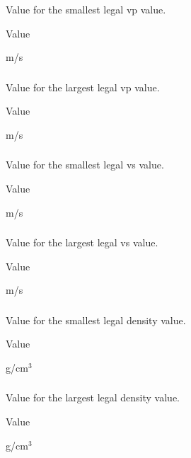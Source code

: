 \subsubsection{}
 \slist
   \item \Description Value for the smallest legal vp value.
   \item \Argument Value
   \item {} m/s
 \elist

\subsubsection{}
 \slist
   \item \Description Value for the largest legal vp value.
   \item \Argument Value
   \item {} m/s
 \elist

\subsubsection{}
 \slist
   \item \Description Value for the smallest legal vs value.
   \item \Argument Value
   \item {} m/s
 \elist

\subsubsection{}
 \slist
   \item \Description Value for the largest legal vs value.
   \item \Argument Value
   \item {} m/s
 \elist

\subsubsection{}
 \slist
   \item \Description Value for the smallest legal density value.
   \item \Argument Value
   \item {} g/cm$^3$
\elist

\subsubsection{}
 \slist
   \item \Description Value for the largest legal density value.
   \item \Argument Value
   \item {} g/cm$^3$
 \elist


